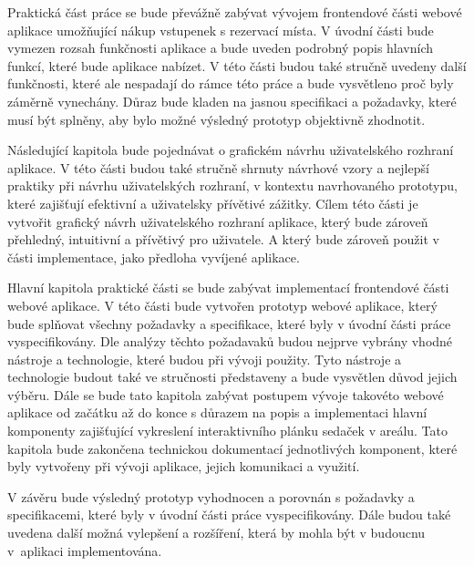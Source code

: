 Praktická část práce se bude převážně zabývat vývojem frontendové části webové aplikace umožňující nákup vstupenek s rezervací místa.
V úvodní části bude vymezen rozsah funkčnosti aplikace a bude uveden podrobný popis hlavních funkcí, které bude aplikace nabízet.
V této části budou také stručně uvedeny další funkčnosti, které ale nespadají do rámce této práce a bude vysvětleno proč byly záměrně vynechány.
Důraz bude kladen na jasnou specifikaci a požadavky, které musí být splněny, aby bylo možné výsledný prototyp objektivně zhodnotit.

Následující kapitola bude pojednávat o grafickém návrhu uživatelského rozhraní aplikace.
V této části budou také stručně shrnuty návrhové vzory a nejlepší praktiky při návrhu uživatelských rozhraní, v kontextu navrhovaného prototypu, které zajišťují efektivní a uživatelsky přívětivé zážitky.
Cílem této části je vytvořit grafický návrh uživatelského rozhraní aplikace, který bude zároveň přehledný, intuitivní a přívětivý pro uživatele.
A který bude zároveň použit v části implementace, jako předloha vyvíjené aplikace.

Hlavní kapitola praktické části se bude zabývat implementací frontendové části webové aplikace.
V této části bude vytvořen prototyp webové aplikace, který bude splňovat všechny požadavky a specifikace, které byly v úvodní části práce vyspecifikovány.
Dle analýzy těchto požadavaků budou nejprve vybrány vhodné nástroje a technologie, které budou při vývoji použity.
Tyto nástroje a technologie budout také ve stručnosti představeny a bude vysvětlen důvod jejich výběru.
Dále se bude tato kapitola zabývat postupem vývoje takovéto webové aplikace od začátku až do konce s důrazem na popis a implementaci hlavní komponenty zajišťující vykreslení interaktivního plánku sedaček v areálu.
Tato kapitola bude zakončena technickou dokumentací jednotlivých komponent, které byly vytvořeny při vývoji aplikace, jejich komunikaci a využití.

V závěru bude výsledný prototyp vyhodnocen a porovnán s požadavky a specifikacemi, které byly v úvodní části práce vyspecifikovány.
Dále budou také uvedena další možná vylepšení a rozšíření, která by mohla být v budoucnu v~aplikaci implementována.
